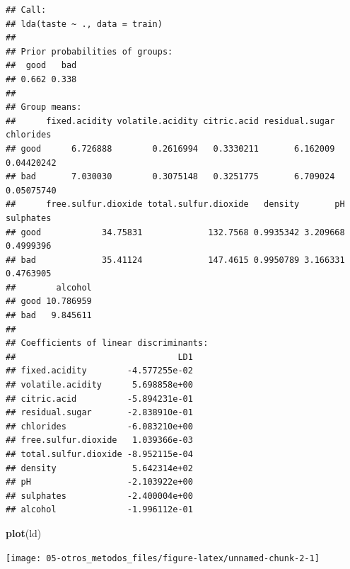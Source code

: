 \documentclass[
]{book}
\newenvironment{Shaded}{\begin{snugshade}}{\end{snugshade}}
\newcommand{\DataTypeTok}[1]{\textcolor[rgb]{0.13,0.29,0.53}{#1}}
\newcommand{\KeywordTok}[1]{\textcolor[rgb]{0.13,0.29,0.53}{\textbf{#1}}}
\newcommand{\NormalTok}[1]{#1}
\newcommand{\OperatorTok}[1]{\textcolor[rgb]{0.81,0.36,0.00}{\textbf{#1}}}
\newcommand{\StringTok}[1]{\textcolor[rgb]{0.31,0.60,0.02}{#1}}
\theoremstyle{break}
\theoremstyle{definition}
\theoremstyle{definition}
\theoremstyle{definition}
\theoremstyle{remark}
\begin{document}
\begin{verbatim}
## Call:
## lda(taste ~ ., data = train)
## 
## Prior probabilities of groups:
##  good   bad 
## 0.662 0.338 
## 
## Group means:
##      fixed.acidity volatile.acidity citric.acid residual.sugar  chlorides
## good      6.726888        0.2616994   0.3330211       6.162009 0.04420242
## bad       7.030030        0.3075148   0.3251775       6.709024 0.05075740
##      free.sulfur.dioxide total.sulfur.dioxide   density       pH sulphates
## good            34.75831             132.7568 0.9935342 3.209668 0.4999396
## bad             35.41124             147.4615 0.9950789 3.166331 0.4763905
##        alcohol
## good 10.786959
## bad   9.845611
## 
## Coefficients of linear discriminants:
##                                LD1
## fixed.acidity        -4.577255e-02
## volatile.acidity      5.698858e+00
## citric.acid          -5.894231e-01
## residual.sugar       -2.838910e-01
## chlorides            -6.083210e+00
## free.sulfur.dioxide   1.039366e-03
## total.sulfur.dioxide -8.952115e-04
## density               5.642314e+02
## pH                   -2.103922e+00
## sulphates            -2.400004e+00
## alcohol              -1.996112e-01
\end{verbatim}

\begin{Shaded}
\begin{Highlighting}[]
\KeywordTok{plot}\NormalTok{(ld)}
\end{Highlighting}
\end{Shaded}

\begin{center}\texttt{[image: 05-otros\_metodos\_files/figure-latex/unnamed-chunk-2-1]} \end{center}

\begin{Shaded}
\end{Shaded}
\end{document}
